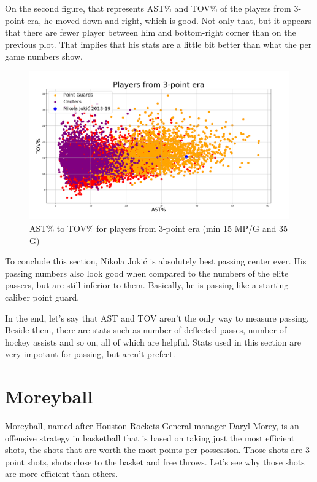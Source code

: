 \documentclass[a4paper]{article}
\begin{document}
On the second figure, that represents AST\% and TOV\% of the players from 3-point era, he moved down and right, which is good. Not only that, but it appears that there are fewer player between him and bottom-right corner than on the previous plot. That implies that his stats are a little bit better than what the per game numbers show.

\begin{figure}[h!]
\begin{center}
\includegraphics[scale=0.30]{ast_tov_pct_3point_era.png}
\end{center}
\caption{AST\% to TOV\% for players from 3-point era (min 15 MP/G and 35 G)}
\label{plt:ast_tov_pct_3p}
\end{figure}

To conclude this section, Nikola Joki\' c is absolutely best passing center ever. His passing numbers also look good when compared to the numbers of the elite passers, but are still inferior to them. Basically, he is passing like a starting caliber point guard.

In the end, let's say that AST and TOV aren't the only way to measure passing. Beside them, there are stats such as number of deflected passes, number of hockey assists and so on, all of which are helpful. Stats used in this section are very impotant for passing, but aren't prefect.

\pagebreak

\section{Moreyball}
\label{sec:moreyball}

Moreyball, named after Houston Rockets General manager Daryl Morey, is an offensive strategy in basketball that is based on taking just the most efficient shots, the shots that are worth the most points per possession. Those shots are 3-point shots, shots close to the basket and free throws. Let's see why those shots are more efficient than others.
\end{document}

